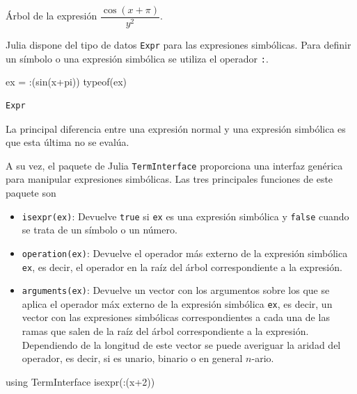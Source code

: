 \documentclass[
  a4paper,
]{scrreport}
\newenvironment{Shaded}{\begin{snugshade}}{\end{snugshade}}
\newcommand{\BuiltInTok}[1]{\textcolor[rgb]{0.00,0.23,0.31}{#1}}
\newcommand{\ConstantTok}[1]{\textcolor[rgb]{0.56,0.35,0.01}{#1}}
\newcommand{\FloatTok}[1]{\textcolor[rgb]{0.68,0.00,0.00}{#1}}
\newcommand{\FunctionTok}[1]{\textcolor[rgb]{0.28,0.35,0.67}{#1}}
\newcommand{\ImportTok}[1]{\textcolor[rgb]{0.00,0.46,0.62}{#1}}
\newcommand{\NormalTok}[1]{\textcolor[rgb]{0.00,0.23,0.31}{#1}}
\newcommand{\OperatorTok}[1]{\textcolor[rgb]{0.37,0.37,0.37}{#1}}
\providecommand{\tightlist}{%
  \setlength{\itemsep}{0pt}\setlength{\parskip}{0pt}}\usepackage{longtable,booktabs,array}
\begin{document}
Árbol de la expresión \(\dfrac{\cos(x+\pi)}{y^2}\).

Julia dispone del tipo de datos \texttt{Expr} para las expresiones
simbólicas. Para definir un símbolo o una expresión simbólica se utiliza
el operador \texttt{:}.

\begin{Shaded}
\begin{Highlighting}[]
\NormalTok{ex }\OperatorTok{=} \OperatorTok{:}\NormalTok{(}\FunctionTok{sin}\NormalTok{(x}\OperatorTok{+}\ConstantTok{pi}\NormalTok{))}
\FunctionTok{typeof}\NormalTok{(ex)}
\end{Highlighting}
\end{Shaded}

\begin{verbatim}
Expr
\end{verbatim}

La principal diferencia entre una expresión normal y una expresión
simbólica es que esta última no se evalúa.

A su vez, el paquete de Julia \texttt{TermInterface} proporciona una
interfaz genérica para manipular expresiones simbólicas. Las tres
principales funciones de este paquete son

\begin{itemize}
\tightlist
\item
  \texttt{isexpr(ex)}: Devuelve \texttt{true} si \texttt{ex} es una
  expresión simbólica y \texttt{false} cuando se trata de un símbolo o
  un número.
\item
  \texttt{operation(ex)}: Devuelve el operador más externo de la
  expresión simbólica \texttt{ex}, es decir, el operador en la raíz del
  árbol correspondiente a la expresión.
\item
  \texttt{arguments(ex)}: Devuelve un vector con los argumentos sobre
  los que se aplica el operador máx externo de la expresión simbólica
  \texttt{ex}, es decir, un vector con las expresiones simbólicas
  correspondientes a cada una de las ramas que salen de la raíz del
  árbol correspondiente a la expresión. Dependiendo de la longitud de
  este vector se puede averiguar la aridad del operador, es decir, si es
  unario, binario o en general \(n\)-ario.
\end{itemize}

\begin{Shaded}
\begin{Highlighting}[]
\ImportTok{using} \BuiltInTok{TermInterface}
\FunctionTok{isexpr}\NormalTok{(}\OperatorTok{:}\NormalTok{(x}\OperatorTok{+}\FloatTok{2}\NormalTok{))}
\end{Highlighting}
\end{Shaded}
\end{document}
